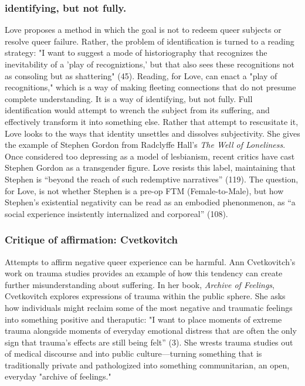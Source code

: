 \documentclass[11pt]{article}
\begin{document}
\subsubsection{identifying, but not fully.}
\label{sec:org882faa6}
Love proposes a method in which the goal is not to redeem queer
subjects or resolve queer failure. Rather, the problem of
identification is turned to a reading strategy: "I want to suggest a
mode of historiography that recognizes the inevitability of a 'play of
recogniztions,' but that also sees these recognitions not as consoling
but as shattering" (45). Reading, for Love, can enact a "play of
recognitions," which is a way of making fleeting connections that do
not presume complete understanding. It is a way of identifying, but
not fully. Full identification would attempt to wrench the subject
from its suffering, and effectively transform it into something
else. Rather that attempt to rescusitate it, Love looks to the ways
that identity unsettles and dissolves subjectivity. She gives the
example of Stephen Gordon from Radclyffe Hall's \emph{The Well of
Loneliness}. Once considered too depressing as a model of lesbianism,
recent critics have cast Stephen Gordon as a transgender figure. Love
resists this label, maintaining that Stephen is “beyond the reach of
such redemptive narratives” (119). The question, for Love, is not
whether Stephen is a pre-op FTM (Female-to-Male), but how Stephen’s
existential negativity can be read as an embodied phenonmenon, as “a
social experience insistently internalized and corporeal” (108).

\subsubsection{Critique of affirmation: Cvetkovitch}
\label{sec:org35847bc}

Attempts to affirm negative queer experience can be harmful. Ann
Cvetkovitch's work on trauma studies provides an example of how this
tendency can create further misunderstanding about suffering. In her
book, \emph{Archive of Feelings}, Cvetkovitch explores expressions of
trauma within the public sphere. She asks how individuals might
reclaim some of the most negative and traumatic feelings into
something positive and theraputic: "I want to place moments of extreme
trauma alongside moments of everyday emotional distress that are often
the only sign that trauma's effects are still being felt” (3). She
wrests trauma studies out of medical discourse and into public
culture---turning something that is traditionally private and
pathologized into something communitarian, an open, everyday "archive
of feelings."
\end{document}
